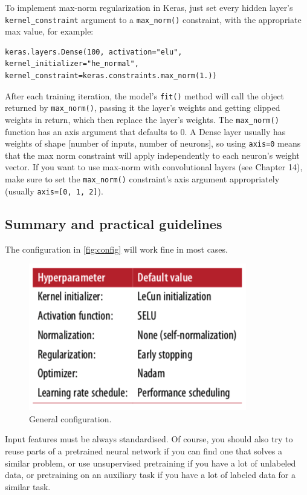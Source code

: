 \documentclass[12pt, letterpaper]{article}
\theoremstyle{definition}
\let\cd\lstinline
\begin{document}
To implement max-norm regularization in Keras, just set every hidden layer's \cd+kernel_constraint+ argument to a \cd+max_norm()+ constraint, with the appropriate max value, for example:
\begin{lstlisting}
keras.layers.Dense(100, activation="elu", kernel_initializer="he_normal", kernel_constraint=keras.constraints.max_norm(1.))
\end{lstlisting}
After each training iteration, the model's \cd+fit()+ method will call the object returned by \cd+max_norm()+, passing it the layer's weights and getting clipped weights in return, which then replace the layer's weights. The \cd+max_norm()+ function has an axis argument that defaults to $0$. A Dense layer usually has weights of shape [number of inputs, number of neurons], so using \cd+axis=0+ means that the max norm constraint will apply independently to each neuron's weight vector. If you want to use max-norm with convolutional layers (see Chapter 14), make sure to set the \cd+max_norm()+ constraint's axis argument appropriately (usually \cd+axis=[0, 1, 2]+).
\subsection{Summary and practical guidelines}
The configuration in \autoref{fig:config} will work fine in most cases.
\begin{figure}
\centering
\includegraphics[scale=0.6]{img/config}
\caption{General configuration.}
\label{fig:config}
\end{figure}
Input features must be always standardised. Of course, you should also try to reuse parts of a pretrained neural network if you can find one that solves a similar problem, or use unsupervised pretraining if you have a lot of unlabeled data, or pretraining on an auxiliary task if you have a lot of labeled data for a similar task.
\end{document}
